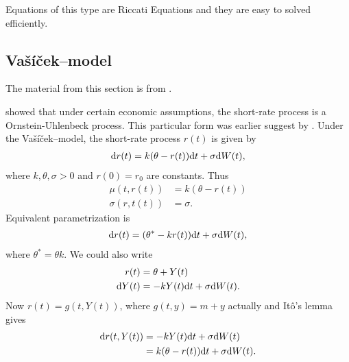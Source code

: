Equations of this type are Riccati Equations and they are easy to solved efficiently.

\subsection{Va\v{s}\'{i}\v{c}ek--model}

The material from this section is from \textcite[pp. 58--62]{brigo2007interest}.

\textcite{vasicek1977equilibrium} showed that under certain economic assumptions, the short-rate process is a Ornstein-Uhlenbeck process. This particular form was earlier suggest by \textcite{merton1971optimum}. Under the Va\v{s}\'{i}\v{c}ek--model, the short-rate process $r(t)$ is given by
\begin{align}
\mathrm{d} r(t) = k ( \theta - r(t) ) \mathrm{d} t + \sigma \mathrm{d} W(t) ,
\end{align}
where $k, \theta, \sigma > 0$ and $r(0) = r_0$ are constants. Thus
	\begin{align}
		\mu(t,r(t)) &= k ( \theta - r(t) ) \\
		\sigma(r,t(t)) &= \sigma .
	\end{align}
Equivalent parametrization is
\begin{align}
\mathrm{d} r(t) = ( \theta^* - k r(t) ) \mathrm{d} t + \sigma \mathrm{d} W(t) ,
\end{align}
where $\theta^* = \theta k$. We could also write
	\begin{align}
		r(t) &= \theta + Y(t) \\
		\mathrm{d} Y(t) &= - k Y(t) \mathrm{d} t + \sigma \mathrm{d} W(t).
	\end{align}
Now $r(t) = g(t,Y(t))$, where $g(t,y) = m + y$ actually and It\^{o}'s lemma gives
	\begin{align}
		\mathrm{d} r(t, Y(t)) &= - k Y(t) \mathrm{d} t + \sigma \mathrm{d} W(t) \\
			&= k ( \theta - r(t) ) \mathrm{d} t + \sigma \mathrm{d} W(t) .
	\end{align}

